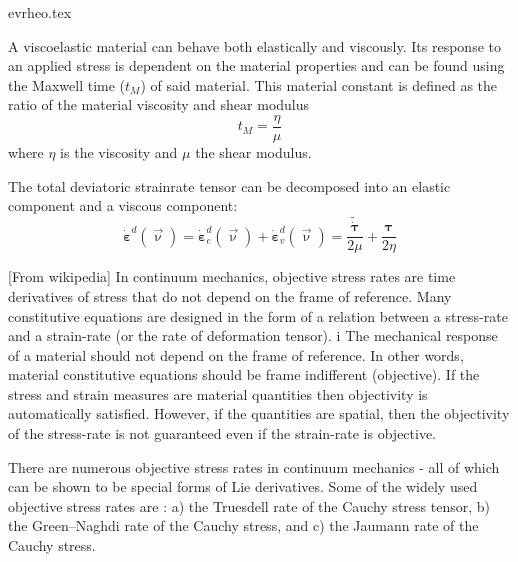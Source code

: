
\begin{flushright} {\tiny {\color{gray} evrheo.tex}} \end{flushright}

A viscoelastic material can behave both elastically and viscously. Its response to 
an applied stress is dependent on the material properties and can be found using 
the Maxwell time ($t_M$) of said material. 
This material constant is defined as the ratio of the material viscosity and shear modulus
\[
t_M = \frac{\eta}{\mu}
\]
where $\eta$ is the viscosity and $\mu$ the shear modulus.

The total deviatoric strainrate tensor can be decomposed into an elastic component and a viscous component:
\[
\dot{{\bm \varepsilon}}^d(\vec\upnu) = 
\dot{{\bm \varepsilon}}^d_e(\vec\upnu)  + \dot{{\bm \varepsilon}}^d_v(\vec\upnu)= 
\frac{\tilde{\dot{\bm \tau}}}{2\mu}
+\frac{\bm \tau}{2 \eta}
\]

[From wikipedia] In continuum mechanics, objective stress rates are time derivatives of 
stress that do not depend on the frame of reference. 
Many constitutive equations are designed in the form of a relation between a 
stress-rate and a strain-rate (or the rate of deformation tensor). i
The mechanical response of a material should not depend on the frame of reference. 
In other words, material constitutive equations should be frame indifferent (objective). 
If the stress and strain measures are material quantities then objectivity is automatically 
satisfied. However, if the quantities are spatial, then the objectivity of the stress-rate 
is not guaranteed even if the strain-rate is objective.

There are numerous objective stress rates in continuum mechanics - 
all of which can be shown to be special forms of Lie derivatives. 
Some of the widely used objective stress rates are \cite{holm20}:
a) the Truesdell rate of the Cauchy stress tensor,
b) the Green–Naghdi rate of the Cauchy stress, and
c) the Jaumann rate of the Cauchy stress.


